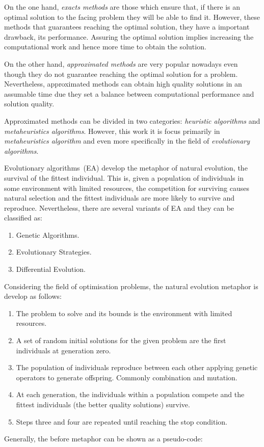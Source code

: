 On the one hand, \textit{exacts methods} are those which ensure that, if there is an optimal solution to the facing problem they will be able to find it. However, these methods that guarantees reaching the optimal solution, they have a important drawback, its performance. Assuring the optimal solution implies increasing the computational work and hence more time to obtain the solution.

On the other hand, \textit{approximated methods} are very popular nowadays even though they do not guarantee reaching the optimal solution for a problem. Nevertheless, approximated methods can obtain high quality solutions in an assumable time due they set a balance between computational performance and solution quality. 

Approximated methods can be divided in two categories: \textit{heuristic algorithms} and \textit{metaheuristics algorithms}. However, this work it is focus primarily in \textit{metaheuristics algorithm} and even more specifically in the field of \textit{evolutionary algorithms}.

Evolutionary algorithms~(EA) develop the metaphor of natural evolution, the survival of the fittest individual\cite{eiben}. This is, given a population of individuals in some environment with limited resources, the competition for surviving causes natural selection and the fittest individuals are more likely to survive and reproduce. Nevertheless, there are several variants of EA and they can be classified as:
\begin{enumerate}
    \item Genetic Algorithms\cite{Whitley1994, Algorithms2004, Sivanandam2008}.
    \item Evolutionary Strategies\cite{Beyer2002, Hansen2017}.
    \item Differential Evolution\cite{Algorithm2006, DE1, DE2, DE3}.
\end{enumerate}

Considering the field of optimisation problems, the natural evolution metaphor is develop as follows:
\begin{enumerate}
    \item The problem to solve and its bounds is the environment with limited resources.
    \item A set of random initial solutions for the given problem are the first individuals at generation zero. 
    \item The population of individuals reproduce between each other applying genetic operators to generate offspring. Commonly combination and mutation.
    \item At each generation, the individuals within a population compete and the fittest individuals (the better quality solutions) survive.
    \item Steps three and four are repeated until reaching the stop condition.
\end{enumerate}
Generally, the before metaphor can be shown as a pseudo-code\cite{eiben}:

